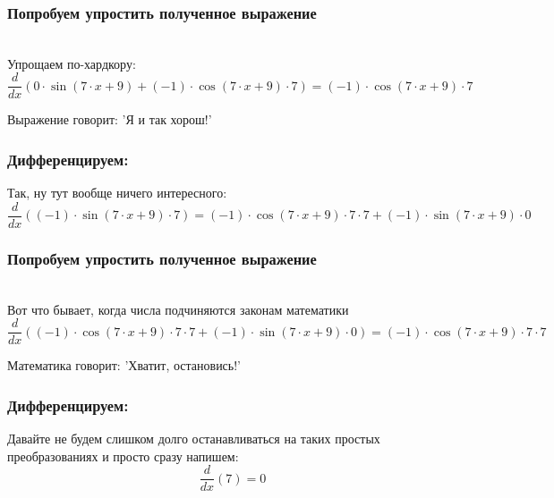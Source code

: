 \documentclass[a4paper,12pt]{article}
\begin{document}
\subsubsection*{Попробуем упростить полученное выражение}
\\Упрощаем по-хардкору:\\
\begin{dmath}
	\frac{d}{dx}\left(0\cdot \operatorname{sin}\left(7\cdot x+ 9\right) + (-1)\cdot \operatorname{cos}\left(7\cdot x+ 9\right) \cdot 7\right) = (-1)\cdot \operatorname{cos}\left(7\cdot x+ 9\right) \cdot 7\end{dmath}

Выражение говорит: 'Я и так хорош!'

\subsubsection*{Дифференцируем:}

Так, ну тут вообще ничего интересного:
\begin{dmath}\frac{d}{dx}\left((-1)\cdot \operatorname{sin}\left(7\cdot x+ 9\right) \cdot 7\right)=(-1)\cdot \operatorname{cos}\left(7\cdot x+ 9\right) \cdot 7\cdot 7+ (-1)\cdot \operatorname{sin}\left(7\cdot x+ 9\right) \cdot 0\end{dmath}
\subsubsection*{Попробуем упростить полученное выражение}
\\Вот что бывает, когда числа подчиняются законам математики\\
\begin{dmath}
	\frac{d}{dx}\left((-1)\cdot \operatorname{cos}\left(7\cdot x+ 9\right) \cdot 7\cdot 7+ (-1)\cdot \operatorname{sin}\left(7\cdot x+ 9\right) \cdot 0\right) = (-1)\cdot \operatorname{cos}\left(7\cdot x+ 9\right) \cdot 7\cdot 7\end{dmath}

Математика говорит: 'Хватит, остановись!'

\subsubsection*{Дифференцируем:}

Давайте не будем слишком долго останавливаться на таких простых преобразованиях и просто сразу напишем:
\begin{dmath}\frac{d}{dx}\left(7\right)=0\end{dmath}
\end{document}
